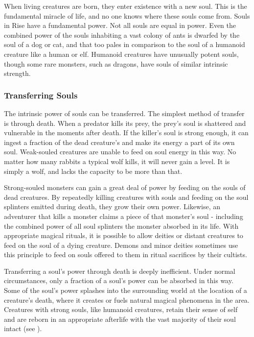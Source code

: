         When living creatures are born, they enter existence with a new soul.
        This is the fundamental miracle of life, and no one knows where these souls come from.
        Souls in Rise have a fundamental power.
        Not all souls are equal in power.
        Even the combined power of the souls inhabiting a vast colony of ants is dwarfed by the soul of a dog or cat, and that too pales in comparison to the soul of a humanoid creature like a human or elf.
        Humanoid creatures have unusually potent souls, though some rare monsters, such as dragons, have souls of similar intrinsic strength.

        \subsubsection{Transferring Souls}
            The intrinsic power of souls can be transferred.
            The simplest method of transfer is through death.
            When a predator kills its prey, the prey's soul is shattered and vulnerable in the moments after death.
            If the killer's soul is strong enough, it can ingest a fraction of the dead creature's and make its energy a part of its own soul.
            Weak-souled creatures are unable to feed on soul energy in this way.
            No matter how many rabbits a typical wolf kills, it will never gain a level.
            It is simply a wolf, and lacks the capacity to be more than that.

            Strong-souled monsters can gain a great deal of power by feeding on the souls of dead creatures.
            By repeatedly killing creatures with souls and feeding on the soul splinters emitted during death, they grow their own power.
            Likewise, an adventurer that kills a monster claims a piece of that monster's soul - including the combined power of all soul splinters the monster absorbed in its life.
            With appropriate magical rituals, it is possible to allow deities or distant creatures to feed on the soul of a dying creature.
            Demons and minor deities sometimes use this principle to feed on souls offered to them in ritual sacrifices by their cultists.

            Transferring a soul's power through death is deeply inefficient.
            Under normal circumstances, only a fraction of a soul's power can be absorbed in this way.
            Some of the soul's power splashes into the surrounding world at the location of a creature's death, where it creates or fuels natural magical phenomena in the area.
            Creatures with strong souls, like humanoid creatures, retain their sense of self and are reborn in an appropriate afterlife with the vast majority of their soul intact (see ).

